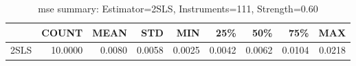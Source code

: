 \begin{table}[ht]
\centering
\caption{mse summary: Estimator=2SLS, Instruments=111, Strength=0.60}
\begin{tabular}{lrrrrrrrr}
\toprule
 & COUNT & MEAN & STD & MIN & 25\% & 50\% & 75\% & MAX \\
\midrule
2SLS & 10.0000 & 0.0080 & 0.0058 & 0.0025 & 0.0042 & 0.0062 & 0.0104 & 0.0218 \\
\bottomrule
\end{tabular}
\end{table}
